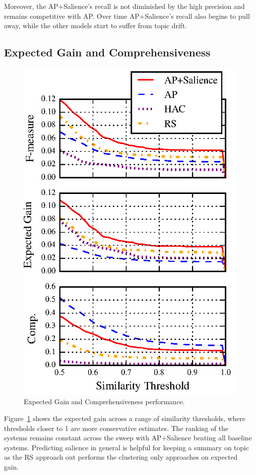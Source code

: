 Moreover, the AP+Salience's recall is not diminished by the high precision and remains competitive with AP.
Over time AP+Salience's recall also begins to pull away, while the other models start to suffer
from topic drift.


\subsection{Expected Gain and Comprehensiveness}
\begin{figure}
  \includegraphics[]{nuggets-metrics.eps}
\caption{Expected Gain and Comprehensiveness performance.}
\label{fig:nperf}
\end{figure}

Figure~\ref{fig:nperf} shows the expected gain across a range of 
similarity thresholds, where thresholds closer to 1 are more conservative
estimates. The ranking of the systems remains constant across the 
sweep with 
AP+Salience beating all baseline systems.
Predicting salience in general is helpful for keeping a summary on topic as
the RS approach out performs the clustering only approaches
on expected gain.

